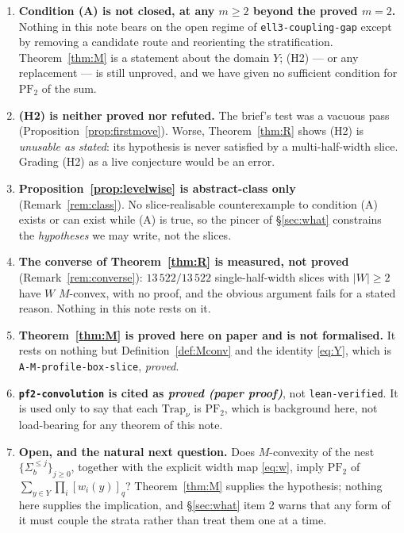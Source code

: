 \documentclass[11pt]{article}
\theoremstyle{plain}
\theoremstyle{definition}
\newcommand{\PFtwo}{\mathrm{PF}_2}
\newcommand{\Trap}{\mathrm{Trap}}
\begin{document}
\begin{enumerate}
\item \textbf{Condition (A) is not closed, at any $m\ge2$ beyond the proved $m=2$.}
  Nothing in this note bears on the open regime of \texttt{ell3-coupling-gap} except by
  removing a candidate route and reorienting the stratification. Theorem~\ref{thm:M} is a
  statement about the domain $Y$; (H2) --- or any replacement --- is still unproved, and we
  have given no sufficient condition for $\PFtwo$ of the sum.
\item \textbf{(H2) is neither proved nor refuted.} The brief's test was a vacuous pass
  (Proposition~\ref{prop:firstmove}). Worse, Theorem~\ref{thm:R} shows (H2) is
  \emph{unusable as stated}: its hypothesis is never satisfied by a multi-half-width
  slice. Grading (H2) as a live conjecture would be an error.
\item \textbf{Proposition~\ref{prop:levelwise} is abstract-class only} (Remark~\ref{rem:class}).
  No slice-realisable counterexample to condition (A) exists or can exist while (A) is true,
  so the pincer of \S\ref{sec:what} constrains the \emph{hypotheses} we may write, not
  the slices.
\item \textbf{The converse of Theorem~\ref{thm:R} is measured, not proved}
  (Remark~\ref{rem:converse}): $13\,522/13\,522$ single-half-width slices with $|W|\ge2$
  have $W$ $M$-convex, with no proof, and the obvious argument fails for a stated reason.
  Nothing in this note rests on it.
\item \textbf{Theorem~\ref{thm:M} is proved here on paper and is not formalised.} It
  rests on nothing but Definition~\ref{def:Mconv} and the identity \eqref{eq:Y}, which is
  \texttt{A-M-profile-box-slice}, \emph{proved}.
\item \textbf{\texttt{pf2-convolution} is cited as \emph{proved (paper proof)}}, not
  \texttt{lean-verified}. It is used only to say that each $\Trap_\nu$ is $\PFtwo$, which
  is background here, not load-bearing for any theorem of this note.
\item \textbf{Open, and the natural next question.} Does $M$-convexity of the nest
  $\{\Sigma_b^{\le j}\}_{j\ge0}$, together with the explicit width map \eqref{eq:w},
  imply $\PFtwo$ of $\sum_{y\in Y}\prod_i[w_i(y)]_q$? Theorem~\ref{thm:M} supplies the
  hypothesis; nothing here supplies the implication, and \S\ref{sec:what} item 2 warns
  that any form of it must couple the strata rather than treat them one at a time.
\end{enumerate}
\end{document}
